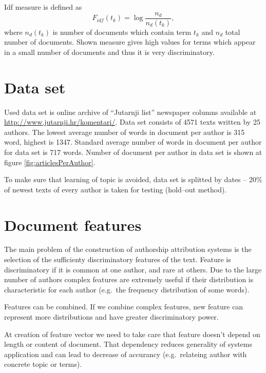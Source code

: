 \documentclass[11pt,english]{article}
\begin{document}
\begin{multicols}{2}
Idf measure is defined as
\begin{equation}
F_{idf}(t_k) = \log \frac{n_d}{n_d(t_k)},
\label{equ:idf}
\end{equation}
where $n_d(t_k)$ is number of documents which contain term $t_k$ and $n_d$
total number of documents. Shown measure gives high values for terms which
appear in a small number of documents and thus it is very discriminatory.

\section{Data set}
\label{sec:podatci}
Used data set is online archive of ``Jutarnji list'' newspaper columns
available at \url{http://www.jutarnji.hr/komentari/}. Data set consists of
4571 texts written by 25 authors. The lowest average number of words in
document per author is 315 word, highest is 1347. Standard average number
of words in document per author for data set is 717 words. Number of document
per author in data set is shown at figure \ref{fig:articlesPerAuthor}.

To make sure that learning of topic is avoided, data set is splitted by dates
-- 20\% of newest texts of every author is taken for testing (hold--out method).

\begin{minipage}{0.8\linewidth}
\vspace{10pt}
\centerline{\resizebox{1.4\linewidth}{!}{}}%
%
\label{fig:articlesPerAuthor}
\end{minipage}

\section{Document features}
The main problem of the construction of authorship attribution systems is the
selection of the sufficienty discriminatory features of the text. Feature is
discriminatory if it is common at one author, and rare at others. Due to the
large number of authors complex features are extremely useful if their
distribution is characteristic for each author (e.g.\ the frequency distribution
of some words).

Features can be combined. If we combine complex features, new feature can
represent more distributions and have greater discriminatory power.

At creation of feature vector we need to take care that feature doesn't depend
on length or content of document. That dependency reduces generality of
systems application and can lead to decrease of accurancy (e.g.\ relateing
author with concrete topic or terms).


\end{multicols}
\end{document}
